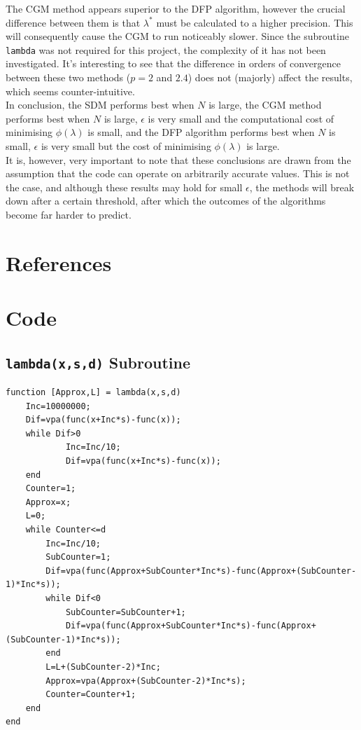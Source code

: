 \documentclass[10pt,a4paper,notitlepage]{article}
\begin{document}
The CGM method appears superior to the DFP algorithm, however the crucial difference between them is that $\lambda^{*}$ must be calculated to a higher precision. This will consequently cause the CGM to run noticeably slower. Since the subroutine \texttt{lambda} was not required for this project, the complexity of it has not been investigated. It's interesting to see that the difference in orders of convergence between these two methods ($p=2$ and $2.4$) does not (majorly) affect the results, which seems counter-intuitive.\\

In conclusion, the SDM performs best when $N$ is large, the CGM method performs best when $N$ is large, $\epsilon$ is very small and the computational cost of minimising $\phi(\lambda)$ is small, and the DFP algorithm performs best when $N$ is small, $\epsilon$ is very small but the cost of minimising $\phi(\lambda)$ is large. \\

It is, however, very important to note that these conclusions are drawn from the assumption that the code can operate on arbitrarily accurate values. This is not the case, and although these results may hold for small $\epsilon$, the methods will break down after a certain threshold, after which the outcomes of the algorithms become far harder to predict. \\




\pagebreak
\section*{\centering References}\label{References}
\printbibliography[heading=none]
\pagebreak
\section*{\centering Code}
\subsection*{\centering \texttt{lambda(x,s,d)} Subroutine}\label{cd:0}
\begin{verbatim}
function [Approx,L] = lambda(x,s,d)
    Inc=10000000;
    Dif=vpa(func(x+Inc*s)-func(x));
    while Dif>0
            Inc=Inc/10;
            Dif=vpa(func(x+Inc*s)-func(x));
    end
    Counter=1;
    Approx=x;
    L=0;
    while Counter<=d
        Inc=Inc/10;
        SubCounter=1;
        Dif=vpa(func(Approx+SubCounter*Inc*s)-func(Approx+(SubCounter-1)*Inc*s));
        while Dif<0
            SubCounter=SubCounter+1;
            Dif=vpa(func(Approx+SubCounter*Inc*s)-func(Approx+(SubCounter-1)*Inc*s));
        end
        L=L+(SubCounter-2)*Inc;
        Approx=vpa(Approx+(SubCounter-2)*Inc*s);
        Counter=Counter+1;
    end
end
\end{verbatim}
\pagebreak
\end{document}
